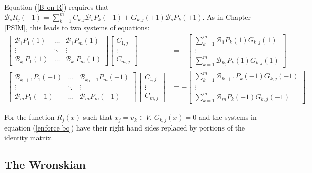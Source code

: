 \documentclass{sfuthesis}
\begin{document}
Equation (\ref{B on R}) requires that $\mathcal{B}_s R_j(\pm 1) = \sum_{k=1}^m C_{k,j} \mathcal{B}_s P_k (\pm1) + G_{k,j} (\pm1) \mathcal{B}_s P_k(\pm1)$.
As in Chapter \ref{PSIM}, this leads to two systems of equations:
\begin{equation} \label{enforce bc}
\begin{aligned}
\begin{bmatrix} \mathcal{B}_1 P_1(1) & \dots &  \mathcal{B}_1 P_m(1) \\ \vdots & \ddots & \vdots \\  \mathcal{B}_{k_0} P_1(1) & \dots &  \mathcal{B}_{k_0} P_m(1)  \end{bmatrix}
\begin{bmatrix} C_{1,j} \\ \vdots \\ C_{m,j} \end{bmatrix}
& = - \begin{bmatrix} \sum_{k=1}^m \mathcal{B}_1 P_k(1) G_{k,j}(1) \\ \vdots \\ \sum_{k=1}^m \mathcal{B}_{k_0} P_k(1) G_{k,j}(1) \end{bmatrix} \\
\begin{bmatrix} \mathcal{B}_{k_0 + 1} P_1(-1) & \dots &  \mathcal{B}_{k_0+1} P_m(-1) \\ \vdots & \ddots & \vdots \\  \mathcal{B}_m P_1(-1) & \dots &  \mathcal{B}_m P_m(-1)  \end{bmatrix}
\begin{bmatrix} C_{1,j} \\ \vdots \\ C_{m,j} \end{bmatrix}
& = - \begin{bmatrix} \sum_{k=1}^m \mathcal{B}_{k_0+1} P_k(-1) G_{k,j}(-1) \\ \vdots \\ \sum_{k=1}^m \mathcal{B}_m P_k(-1) G_{k,j}(-1) \end{bmatrix} .
\end{aligned}
\end{equation}

For the function $R_j(x)$ such that $x_j = v_k \in V$, $G_{k,j}(x) = 0$ and the systems in equation (\ref{enforce bc}) have their right hand sides replaced by portions of the identity matrix.

\subsection{The Wronskian}
\end{document}

